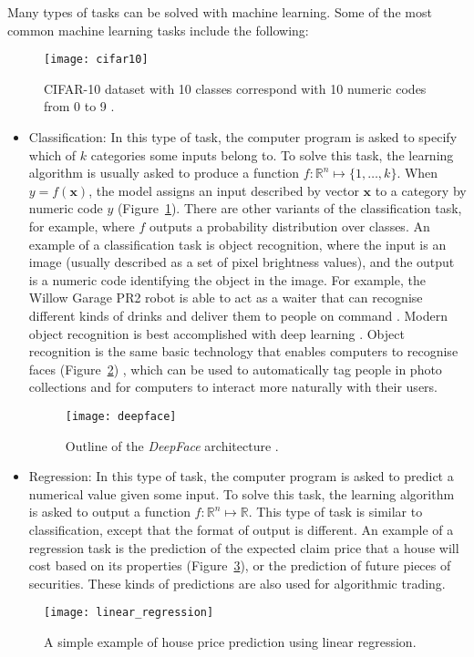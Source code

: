 Many types of tasks can be solved with machine learning. Some of the most
common machine learning tasks include the following:
\begin{figure}
    \centering
    \texttt{[image: cifar10]}
    \caption{
        CIFAR-10 dataset \cite{Krizhevsky2009LearningML}
        with 10 classes correspond with 10 numeric codes from 0 to 9
        \cite{cifar10_thumbnails}.
    }
    \label{fig:cifar10}
\end{figure}
\begin{itemize}
    \item Classification: In this type of task, the computer program is asked
    to specify which of $k$ categories some inputs belong to. To solve this
    task, the learning algorithm is usually asked to produce a function
    $f:\mathbb{R}^n\mapsto\{1,\dots,k\}$. When $y=f(\boldsymbol{x})$, the model
    assigns an input described by vector $\boldsymbol{x}$ to a category by
    numeric code $y$ (Figure~\ref{fig:cifar10}).
    There are other variants of the classification task, for
    example, where $f$ outputs a probability distribution over classes. An
    example of a classification task is object recognition, where the input is
    an image (usually described as a set of pixel brightness values), and the
    output is a numeric code identifying the object in the image. For example,
    the Willow Garage PR2 robot is able to act as a waiter that can recognise
    different kinds of drinks and deliver them to people on command
    \cite{5453203}. Modern object recognition is best accomplished with deep
    learning \cite{Krizhevsky:2017:ICD:3098997.3065386,
    DBLP:journals/corr/IoffeS15}.
    Object recognition is the same basic technology that enables computers to
    recognise faces (Figure~\ref{fig:deepface}) \cite{6909616}, which can be
    used to automatically tag people in photo collections and for computers
    to interact more naturally with their users.
    \begin{figure}
        \centering
        \texttt{[image: deepface]}
        \caption{
            Outline of the \emph{DeepFace} architecture \cite{6909616}.
        }
        \label{fig:deepface}
    \end{figure}
    \item Regression: In this type of task, the computer
    program is asked to predict a numerical value given some input. To solve
    this task, the learning algorithm is asked to output a function
    $f:\mathbb{R}^n\mapsto\mathbb{R}$. This type of task is similar to
    classification, except that the format of output is different. An example
    of a regression task is the prediction of the expected claim price that a
    house will cost based on its properties
    (Figure~\ref{fig:linear_regression}), or the prediction of future pieces
    of securities. These kinds of predictions are also used for algorithmic
    trading.
\end{itemize}
\begin{figure}[h]
    \centering
    \texttt{[image: linear\_regression]}
    \caption{A simple example of house price prediction using linear regression.}
    \label{fig:linear_regression}
\end{figure}

